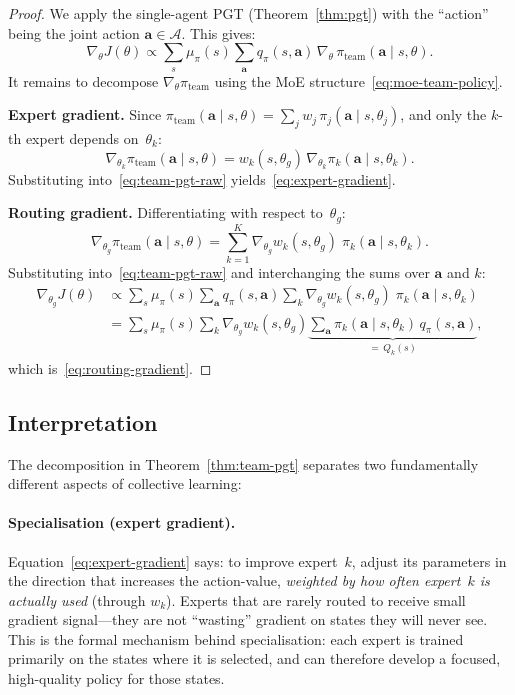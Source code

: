 \begin{proof}
We apply the single-agent PGT (Theorem~\ref{thm:pgt}) with the ``action'' being the joint action $\bm{a}\in\bm{\mathcal{A}}$. This gives:
\begin{equation}\label{eq:team-pgt-raw}
  \nabla_\theta J(\theta) \propto \sum_s \mu_\pi(s) \sum_{\bm{a}} q_\pi(s,\bm{a})\, \nabla_\theta\,\pi_{\mathrm{team}}(\bm{a}\mid s,\theta).
\end{equation}
It remains to decompose $\nabla_\theta\pi_{\mathrm{team}}$ using the MoE structure~\eqref{eq:moe-team-policy}.

\medskip\noindent\textbf{Expert gradient.} Since $\pi_{\mathrm{team}}(\bm{a}\mid s,\theta) = \sum_j w_j\,\pi_j(\bm{a}\mid s,\theta_j)$, and only the $k$-th expert depends on~$\theta_k$:
\[
  \nabla_{\theta_k}\pi_{\mathrm{team}}(\bm{a}\mid s,\theta) = w_k(s,\theta_g)\,\nabla_{\theta_k}\pi_k(\bm{a}\mid s,\theta_k).
\]
Substituting into~\eqref{eq:team-pgt-raw} yields~\eqref{eq:expert-gradient}.

\medskip\noindent\textbf{Routing gradient.} Differentiating with respect to~$\theta_g$:
\[
  \nabla_{\theta_g}\pi_{\mathrm{team}}(\bm{a}\mid s,\theta) = \sum_{k=1}^K \nabla_{\theta_g}w_k(s,\theta_g)\;\pi_k(\bm{a}\mid s,\theta_k).
\]
Substituting into~\eqref{eq:team-pgt-raw} and interchanging the sums over $\bm{a}$ and $k$:
\begin{align*}
  \nabla_{\theta_g} J(\theta)
  &\propto \sum_s \mu_\pi(s) \sum_{\bm{a}} q_\pi(s,\bm{a}) \sum_k \nabla_{\theta_g}w_k(s,\theta_g)\;\pi_k(\bm{a}\mid s,\theta_k) \\
  &= \sum_s \mu_\pi(s) \sum_k \nabla_{\theta_g}w_k(s,\theta_g) \underbrace{\sum_{\bm{a}} \pi_k(\bm{a}\mid s,\theta_k)\, q_\pi(s,\bm{a})}_{=\,Q_k(s)},
\end{align*}
which is~\eqref{eq:routing-gradient}.
\end{proof}

\subsection{Interpretation}
\label{subsec:team-pgt-interp}

The decomposition in Theorem~\ref{thm:team-pgt} separates two fundamentally different aspects of collective learning:

\paragraph{Specialisation (expert gradient).} Equation~\eqref{eq:expert-gradient} says: to improve expert~$k$, adjust its parameters in the direction that increases the action-value, \emph{weighted by how often expert~$k$ is actually used} (through $w_k$). Experts that are rarely routed to receive small gradient signal---they are not ``wasting'' gradient on states they will never see. This is the formal mechanism behind specialisation: each expert is trained primarily on the states where it is selected, and can therefore develop a focused, high-quality policy for those states.

